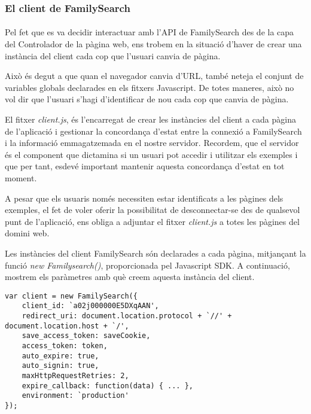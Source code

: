 \subsubsection{El client de FamilySearch}

\paragraph{}
Pel fet que es va decidir interactuar amb l'API de FamilySearch des de la capa del Controlador de la pàgina web, ens trobem en la situació d'haver de crear una instància del client cada cop que l'usuari canvia de pàgina.

Això és degut a que quan el navegador canvia d'URL, també neteja el conjunt de variables globals declarades en els fitxers Javascript. De totes maneres, això no vol dir que l'usuari s'hagi d'identificar de nou cada cop que canvia de pàgina.

El fitxer \emph{client.js}, és l'encarregat de crear les instàncies del client a cada pàgina de l'aplicació i gestionar la concordança d'estat entre la connexió a FamilySearch i la informació emmagatzemada en el nostre servidor. Recordem, que el servidor és el component que dictamina si un usuari pot accedir i utilitzar els exemples i que per tant, esdevé important mantenir aquesta concordança d'estat en tot moment.

A pesar que els usuaris només necessiten estar identificats a les pàgines dels exemples, el fet de voler oferir la possibilitat de desconnectar-se des de qualsevol punt de l'aplicació, ens obliga a adjuntar el fitxer \emph{client.js} a totes les pàgines del domini web.

Les instàncies del client FamilySearch són declarades a cada pàgina, mitjançant la funció \emph{new Familysearch()}, proporcionada pel Javascript SDK. A continuació, mostrem els paràmetres amb què creem aquesta instància del client.

\begin{lstlisting}[style=rawOwn,caption={Creació d'una instància del client FamilySearch}]
var client = new FamilySearch({
    client_id: `a02j000000E5DXqAAN',
    redirect_uri: document.location.protocol + `//' + document.location.host + `/',
    save_access_token: saveCookie,
    access_token: token,
    auto_expire: true,
    auto_signin: true,
    maxHttpRequestRetries: 2,
    expire_callback: function(data) { ... },
    environment: `production'
});
\end{lstlisting}

